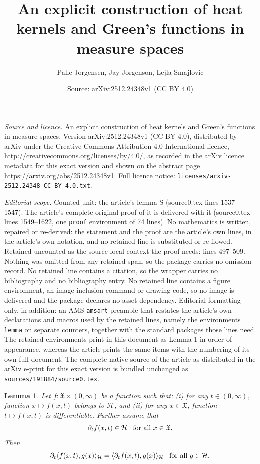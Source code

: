 \documentclass[10pt,a4paper]{amsart}
\title{An explicit construction of heat kernels and Green's functions in measure spaces}
\author{Palle Jorgensen, Jay Jorgenson, Lejla Smajlovic}
\date{Source: arXiv:2512.24348v1 (CC BY 4.0)}
\newtheorem{lemma}{Lemma}
\newcommand{\Hil}{\mathcal{H}}
\newcommand{\X}{\mathfrak{X}}
\begin{document}
\maketitle

\noindent\emph{Source and licence.} An explicit construction of heat kernels and Green's functions in measure spaces. Version arXiv:2512.24348v1 (CC BY 4.0), distributed by arXiv under the Creative Commons Attribution 4.0 International licence, http://creativecommons.org/licenses/by/4.0/, as recorded in the arXiv licence metadata for this exact version and shown on the abstract page https://arxiv.org/abs/2512.24348v1. Full licence notice: \texttt{licenses/arxiv-2512.24348-CC-BY-4.0.txt}.\par\smallskip

\noindent\textit{Editorial scope.} Counted unit: the article's lemma S (source0.tex lines 1537--1547). The article's complete original proof of it is delivered with it (source0.tex lines 1549--1622, one \texttt{proof} environment of 74 lines). No mathematics is written, repaired or re-derived: the statement and the proof are the article's own lines, in the article's own notation, and no retained line is substituted or re-flowed.  Retained uncounted as the source-local context the proof needs: lines 497--509.  Nothing was omitted from any retained span, so the package carries no omission record.  No retained line contains a citation, so the wrapper carries no bibliography and no bibliography entry.  No retained line contains a figure environment, an image-inclusion command or drawing code, so no image is delivered and the package declares no asset dependency.  Editorial formatting only, in addition: an AMS \texttt{amsart} preamble that restates the article's own declarations and macros used by the retained lines, namely the environments \texttt{lemma} on separate counters, together with the standard packages those lines need.  The retained environments print in this document as Lemma 1 in order of appearance, whereas the article prints the same items with the numbering of its own full document.  The complete native source of the article as distributed in the arXiv e-print for this exact version is bundled unchanged as \texttt{sources/191884/source0.tex}.
\begin{lemma} \label{lem: dif of inner product wrt t}
   Let $f:\X\times(0,\infty)$ be a function such that: (i) for any $t\in(0,\infty)$, function $x\mapsto f(x,t)$ belongs to $\Hil$, and (ii) for any $x\in\X$, function $t\mapsto f(x,t)$ is differentiable. Further assume that
   $$
   \partial_t f(x,t)\in \Hil
   \,\,\,\,\,
   \text{\rm for all $x\in\X$.}
   $$
    Then
   $$\partial_t \langle f(x,t),g(x)\rangle_{\Hil} = \langle \partial _t f(x,t),g(x)\rangle_{\Hil}
   \,\,\,\,\,
   \text{\rm for all $g\in\Hil.$}
   $$
\end{lemma}
\end{document}
